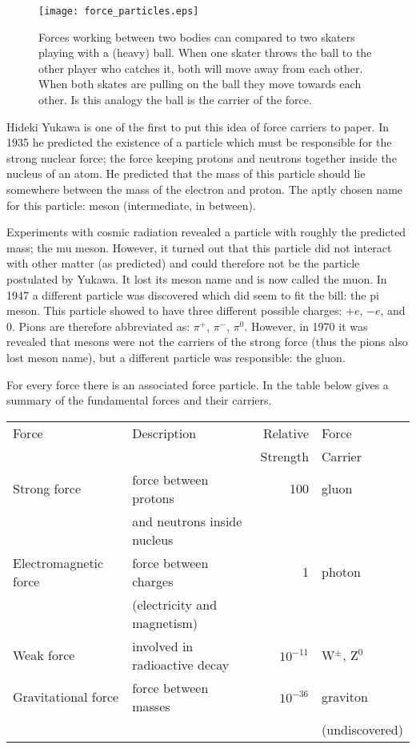 \begin{figure}\begin{center}
\texttt{[image: force\_particles.eps]}%
\caption{Forces working between two bodies can compared to two skaters playing with a (heavy) ball. When one skater throws the ball to the other player who catches it, both will move away from each other. When both skates are pulling on the ball they move towards each other. Is this analogy the ball is the carrier of the force.}\label{fig:force_particles}
\end{center}\end{figure}

Hideki Yukawa is one of the first to put this idea of force carriers to paper. In 1935 he predicted the existence of a particle which must be responsible for the strong nuclear force; the force keeping protons and neutrons together inside the nucleus of an atom. He predicted that the mass of this particle should lie somewhere between the mass of the electron and proton. The aptly chosen name for this particle: meson (intermediate, in between).

Experiments with cosmic radiation revealed a particle with roughly the predicted mass; the mu meson. However, it turned out that this particle did not interact with other matter (as predicted) and could therefore not be the particle postulated by Yukawa. It lost its meson name and is now called the muon. In 1947 a different particle was discovered which did seem to fit the bill: the pi meson. This particle showed to have three different possible charges: $+e$, $-e$, and $0$. Pions are therefore abbreviated as: $\pi^+$, $\pi^-$, $\pi^0$. However, in 1970 it was revealed that mesons were not the carriers of the strong force (thus the pions also lost meson name), but a different particle was responsible: the gluon.

For every force there is an associated force particle. In the table below gives a summary of the fundamental forces and their carriers.

\begin{center}\begin{tabular}[h] {l l r l}
Force & Description & Relative & Force  \\
& & Strength & Carrier\\\hline
Strong force & force between protons  & 100 & gluon \\
& and neutrons inside nucleus\\
Electromagnetic force & force between charges & 1 & photon \\
& (electricity and magnetism) \\
Weak force & involved in radioactive decay & $10^{-11}$ & W$^\pm$, Z$^0$ \\
Gravitational force & force between masses & $10^{-36}$ & graviton \\
& & & (undiscovered)
\end{tabular}\end{center}
\label{tab:data_1}

